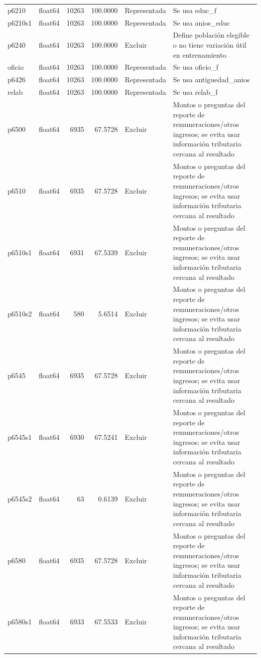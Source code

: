 \begin{longtable}{llrrll}
p6210 & float64 & 10263 & 100.0000 & Representada & Se usa educ\_f \\
p6210s1 & float64 & 10263 & 100.0000 & Representada & Se usa anios\_educ \\
p6240 & float64 & 10263 & 100.0000 & Excluir & Define población elegible o no tiene variación útil en entrenamiento \\
oficio & float64 & 10263 & 100.0000 & Representada & Se usa oficio\_f \\
p6426 & float64 & 10263 & 100.0000 & Representada & Se usa antiguedad\_anios \\
relab & float64 & 10263 & 100.0000 & Representada & Se usa relab\_f \\
p6500 & float64 & 6935 & 67.5728 & Excluir & Montos o preguntas del reporte de remuneraciones/otros ingresos; se evita usar información tributaria cercana al resultado \\
p6510 & float64 & 6935 & 67.5728 & Excluir & Montos o preguntas del reporte de remuneraciones/otros ingresos; se evita usar información tributaria cercana al resultado \\
p6510s1 & float64 & 6931 & 67.5339 & Excluir & Montos o preguntas del reporte de remuneraciones/otros ingresos; se evita usar información tributaria cercana al resultado \\
p6510s2 & float64 & 580 & 5.6514 & Excluir & Montos o preguntas del reporte de remuneraciones/otros ingresos; se evita usar información tributaria cercana al resultado \\
p6545 & float64 & 6935 & 67.5728 & Excluir & Montos o preguntas del reporte de remuneraciones/otros ingresos; se evita usar información tributaria cercana al resultado \\
p6545s1 & float64 & 6930 & 67.5241 & Excluir & Montos o preguntas del reporte de remuneraciones/otros ingresos; se evita usar información tributaria cercana al resultado \\
p6545s2 & float64 & 63 & 0.6139 & Excluir & Montos o preguntas del reporte de remuneraciones/otros ingresos; se evita usar información tributaria cercana al resultado \\
p6580 & float64 & 6935 & 67.5728 & Excluir & Montos o preguntas del reporte de remuneraciones/otros ingresos; se evita usar información tributaria cercana al resultado \\
p6580s1 & float64 & 6933 & 67.5533 & Excluir & Montos o preguntas del reporte de remuneraciones/otros ingresos; se evita usar información tributaria cercana al resultado \\

\end{longtable}
